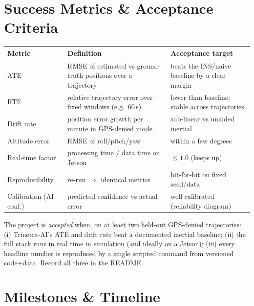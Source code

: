 \documentclass[11pt]{article}
\begin{document}
\section{Success Metrics \& Acceptance Criteria}\label{sec:metrics}

\begin{center}\footnotesize
\begin{tabular}{@{}p{3.4cm}p{4.6cm}p{4.4cm}@{}}
\toprule
\textbf{Metric} & \textbf{Definition} & \textbf{Acceptance target}\\
\midrule
ATE & RMSE of estimated vs ground-truth positions over a trajectory & beats the INS/naive baseline by a clear margin\\
RTE & relative trajectory error over fixed windows (e.g.\ 60\,s) & lower than baseline; stable across trajectories\\
Drift rate & position error growth per minute in GPS-denied mode & sub-linear vs unaided inertial\\
Attitude error & RMSE of roll/pitch/yaw & within a few degrees\\
Real-time factor & processing time / data time on Jetson & $\le 1.0$ (keeps up)\\
Reproducibility & re-run $\Rightarrow$ identical metrics & bit-for-bit on fixed seed/data\\
Calibration (AI conf.) & predicted confidence vs actual error & well-calibrated (reliability diagram)\\
\bottomrule
\end{tabular}
\end{center}

\begin{dodbox}
The project is \emph{accepted} when, on at least two held-out GPS-denied trajectories: (i)
Trinetra-AI's ATE and drift rate beat a documented inertial baseline; (ii) the full stack runs
in real time in simulation (and ideally on a Jetson); (iii) every headline number is
reproduced by a single scripted command from versioned code+data. Record all three in the
README.
\end{dodbox}

\section{Milestones \& Timeline}\label{sec:milestones}

\begin{center}
\end{center}
\end{document}
